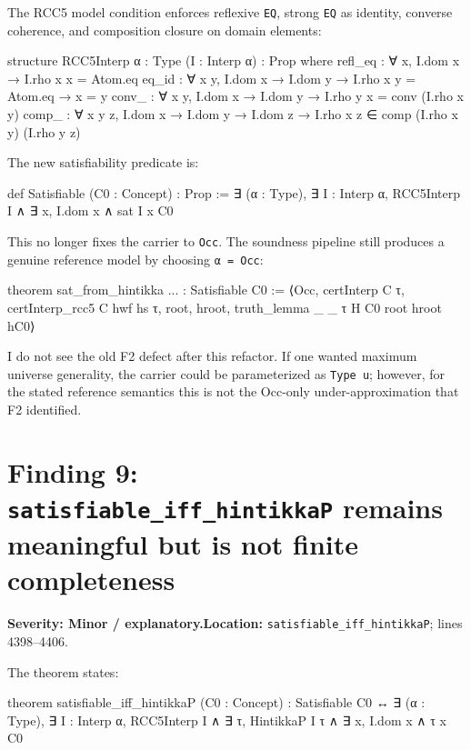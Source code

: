 \documentclass[11pt]{article}
\newcommand{\sev}[1]{\textbf{Severity: #1}}
\begin{document}
The RCC5 model condition enforces reflexive \texttt{EQ}, strong \texttt{EQ} as identity, converse coherence, and composition closure on domain elements:

\begin{leancode}
structure RCC5Interp {α : Type} (I : Interp α) : Prop where
  refl_eq : ∀ x, I.dom x → I.rho x x = Atom.eq
  eq_id : ∀ x y, I.dom x → I.dom y → I.rho x y = Atom.eq → x = y
  conv_ : ∀ x y, I.dom x → I.dom y → I.rho y x = conv (I.rho x y)
  comp_ : ∀ x y z, I.dom x → I.dom y → I.dom z →
    I.rho x z ∈ comp (I.rho x y) (I.rho y z)
\end{leancode}

The new satisfiability predicate is:

\begin{leancode}
def Satisfiable (C0 : Concept) : Prop :=
  ∃ (α : Type), ∃ I : Interp α,
    RCC5Interp I ∧ ∃ x, I.dom x ∧ sat I x C0
\end{leancode}

This no longer fixes the carrier to \texttt{Occ}. The soundness pipeline still produces a genuine reference model by choosing \texttt{α = Occ}:

\begin{leancode}
theorem sat_from_hintikka ... : Satisfiable C0 :=
  ⟨Occ, certInterp C τ, certInterp_rcc5 C hwf hs τ, root, hroot,
    truth_lemma _ _ τ H C0 root hroot hC0⟩
\end{leancode}

I do not see the old F2 defect after this refactor. If one wanted maximum universe generality, the carrier could be parameterized as \texttt{Type u}; however, for the stated reference semantics this is not the Occ-only under-approximation that F2 identified.

\section{Finding 9: \texttt{satisfiable\_iff\_hintikkaP} remains meaningful but is not finite completeness}

\sev{Minor / explanatory.}\quad \textbf{Location:} \texttt{satisfiable\_iff\_hintikkaP}; lines 4398--4406.

The theorem states:

\begin{leancode}
theorem satisfiable_iff_hintikkaP (C0 : Concept) :
    Satisfiable C0 ↔
      ∃ (α : Type), ∃ I : Interp α,
        RCC5Interp I ∧ ∃ τ, HintikkaP I τ ∧ ∃ x, I.dom x ∧ τ x C0
\end{leancode}
\end{document}
